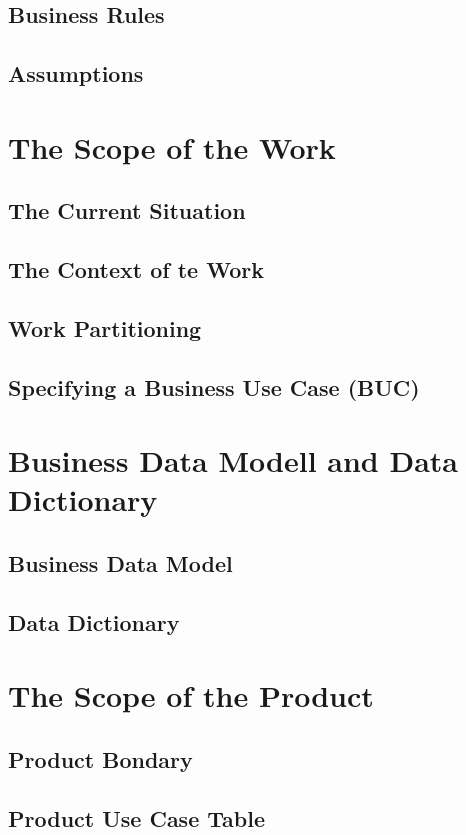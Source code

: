 \documentclass[]{article}
\begin{document}
\subsection{Business Rules}
\subsection{Assumptions}

\section{The Scope of the Work}
\subsection{The Current Situation}
\subsection{The Context of te Work}
\subsection{Work Partitioning}
\subsection{Specifying a Business Use Case (BUC)}

\section{Business Data Modell and Data Dictionary}
\subsection{Business Data Model}
\subsection{Data Dictionary}

\section{The Scope of the Product}
\subsection{Product Bondary}
\subsection{Product Use Case Table}
\end{document}
